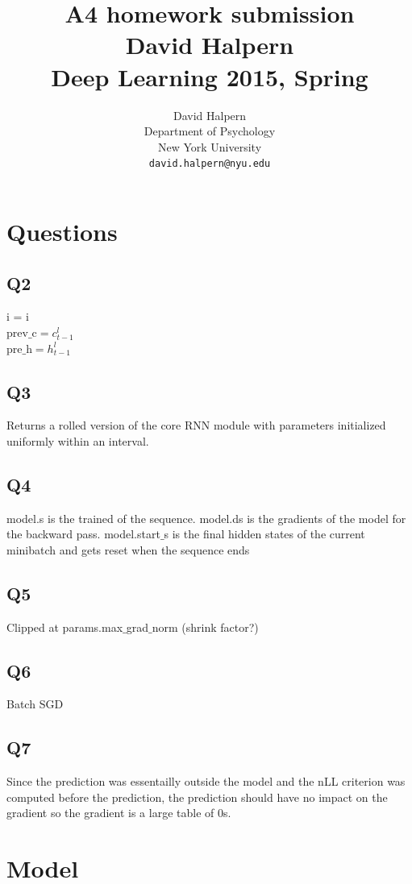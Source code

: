 \documentclass{article} %
\title{A4 homework submission \\ David Halpern \\ Deep Learning 2015, Spring}
\author{
David Halpern\\
Department of Psychology\\
New York University\\
\texttt{david.halpern@nyu.edu} \\
}
\begin{document}
\maketitle


\section{Questions}

\subsection{Q2}

i = i\\
$\text{prev\_c} = c_{t-1}^l$\\
$\text{pre\_h} = h_{t-1}^l$

\subsection{Q3}
Returns a rolled version of the core RNN module with parameters initialized uniformly within an interval.

\subsection{Q4}
model.s is the trained of the sequence. model.ds is the gradients of the model for the backward pass. model.start$\_$s is the final hidden states of the current minibatch and gets reset when the sequence ends

\subsection{Q5}
Clipped at params.max$\_$grad$\_$norm (shrink factor?)

\subsection{Q6}
Batch SGD

\subsection{Q7}
Since the prediction was essentailly outside the model and the nLL criterion was computed before the prediction, the prediction should have no impact on the gradient so the gradient is a large table of 0s.

\section{Model}
\end{document}
